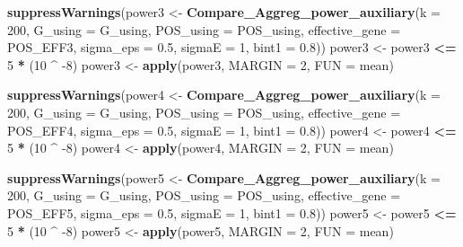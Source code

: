 \documentclass[
]{article}
\newenvironment{Shaded}{\begin{snugshade}}{\end{snugshade}}
\newcommand{\DataTypeTok}[1]{\textcolor[rgb]{0.13,0.29,0.53}{#1}}
\newcommand{\DecValTok}[1]{\textcolor[rgb]{0.00,0.00,0.81}{#1}}
\newcommand{\FloatTok}[1]{\textcolor[rgb]{0.00,0.00,0.81}{#1}}
\newcommand{\KeywordTok}[1]{\textcolor[rgb]{0.13,0.29,0.53}{\textbf{#1}}}
\newcommand{\NormalTok}[1]{#1}
\newcommand{\OperatorTok}[1]{\textcolor[rgb]{0.81,0.36,0.00}{\textbf{#1}}}
\newcommand{\StringTok}[1]{\textcolor[rgb]{0.31,0.60,0.02}{#1}}
\begin{document}
\begin{Shaded}
\begin{Highlighting}[]
\KeywordTok{suppressWarnings}\NormalTok{(power3 <-}\StringTok{ }\KeywordTok{Compare_Aggreg_power_auxiliary}\NormalTok{(}\DataTypeTok{k =} \DecValTok{200}\NormalTok{, }\DataTypeTok{G_using =}\NormalTok{ G_using, }\DataTypeTok{POS_using =}\NormalTok{ POS_using, }\DataTypeTok{effective_gene =}\NormalTok{ POS_EFF3, }\DataTypeTok{sigma_eps =} \FloatTok{0.5}\NormalTok{, }\DataTypeTok{sigmaE =} \DecValTok{1}\NormalTok{, }\DataTypeTok{bint1 =} \FloatTok{0.8}\NormalTok{))}
\NormalTok{power3 <-}\StringTok{ }\NormalTok{power3 }\OperatorTok{<=}\StringTok{ }\DecValTok{5} \OperatorTok{*}\StringTok{ }\NormalTok{(}\DecValTok{10} \OperatorTok{^}\StringTok{ }\DecValTok{-8}\NormalTok{)}
\NormalTok{power3 <-}\StringTok{ }\KeywordTok{apply}\NormalTok{(power3, }\DataTypeTok{MARGIN =} \DecValTok{2}\NormalTok{, }\DataTypeTok{FUN =}\NormalTok{ mean)}

\KeywordTok{suppressWarnings}\NormalTok{(power4 <-}\StringTok{ }\KeywordTok{Compare_Aggreg_power_auxiliary}\NormalTok{(}\DataTypeTok{k =} \DecValTok{200}\NormalTok{, }\DataTypeTok{G_using =}\NormalTok{ G_using, }\DataTypeTok{POS_using =}\NormalTok{ POS_using, }\DataTypeTok{effective_gene =}\NormalTok{ POS_EFF4, }\DataTypeTok{sigma_eps =} \FloatTok{0.5}\NormalTok{, }\DataTypeTok{sigmaE =} \DecValTok{1}\NormalTok{, }\DataTypeTok{bint1 =} \FloatTok{0.8}\NormalTok{))}
\NormalTok{power4 <-}\StringTok{ }\NormalTok{power4 }\OperatorTok{<=}\StringTok{ }\DecValTok{5} \OperatorTok{*}\StringTok{ }\NormalTok{(}\DecValTok{10} \OperatorTok{^}\StringTok{ }\DecValTok{-8}\NormalTok{)}
\NormalTok{power4 <-}\StringTok{ }\KeywordTok{apply}\NormalTok{(power4, }\DataTypeTok{MARGIN =} \DecValTok{2}\NormalTok{, }\DataTypeTok{FUN =}\NormalTok{ mean)}

\KeywordTok{suppressWarnings}\NormalTok{(power5 <-}\StringTok{ }\KeywordTok{Compare_Aggreg_power_auxiliary}\NormalTok{(}\DataTypeTok{k =} \DecValTok{200}\NormalTok{, }\DataTypeTok{G_using =}\NormalTok{ G_using, }\DataTypeTok{POS_using =}\NormalTok{ POS_using, }\DataTypeTok{effective_gene =}\NormalTok{ POS_EFF5, }\DataTypeTok{sigma_eps =} \FloatTok{0.5}\NormalTok{, }\DataTypeTok{sigmaE =} \DecValTok{1}\NormalTok{, }\DataTypeTok{bint1 =} \FloatTok{0.8}\NormalTok{))}
\NormalTok{power5 <-}\StringTok{ }\NormalTok{power5 }\OperatorTok{<=}\StringTok{ }\DecValTok{5} \OperatorTok{*}\StringTok{ }\NormalTok{(}\DecValTok{10} \OperatorTok{^}\StringTok{ }\DecValTok{-8}\NormalTok{)}
\NormalTok{power5 <-}\StringTok{ }\KeywordTok{apply}\NormalTok{(power5, }\DataTypeTok{MARGIN =} \DecValTok{2}\NormalTok{, }\DataTypeTok{FUN =}\NormalTok{ mean)}


\end{Highlighting}
\end{Shaded}
\end{document}

